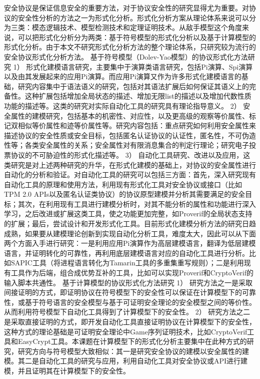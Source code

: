 安全协议是保证信息安全的重要方法，对于协议安全性的研究显得尤为重要。对协议的安全性分析的方法之一为形式化分析。形式化分析方案从理论体系来说可以分为三类：模态逻辑技术、模型检测技术和定理证明技术。从敌手模型这个角度来说，可以把形式化分析分为两类：基于符号模型的形式化分析以及基于计算模型的形式化分析。由于本文不研究形式化分析方法的整个理论体系，只研究较为流行的安全协议形式化分析方法。
基于符号模型（Dolev-Yao模型）的协议形式化方法研究
1）	形式化建模语言研究，主要集中于演算类语言研究，包括Pi演算、Spi演算以及由其发展起来的应用Pi演算。而应用Pi演算又作为许多形式化建模语言的基础，研究内容集中于语法语义的研究，包括对其语法扩展后如何保证其语义上的完备性。这种扩展包括增加全局状态的描述、增加无限list的描述以及增加代数性质功能的描述等。这类的研究对实际自动化工具的研究具有理论指导意义。
2）	安全属性的建模研究，包括基本的机密性、对应性，以及更高级的观察等价属性、标记双相似等价属性和迹等价属性等。研究内容包括：重点研究如何利用安全属性来描述协议的安全性质或安全目标，包括匿名认证协议的认证性，匿名性，不可伪造性等；各类安全属性的关系；安全属性对有限消息集合的判定行理论；研究电子投票协议的不可胁迫性的形式化描述等。
3）	自动化工具研究、改进以及应用，这类研究是对上述两种研究的升华，在形式化建模的基础上，对协议的安全属性进行自动化的分析和验证。对自动化工具的研究可以包括三方面：首先，深入研究现有自动化工具的原理和使用方法，利用现有形式化工具对安全协议或接口（比如TPM 2.0 APIs以及匿名认证类协议）的协议原型建模并分析其需要满足的安全目标；其次，在利用现有工具进行建模分析时，对其不能分析的属性和功能进行深入学习，之后改进或扩展这类工具，使之功能更加完整，如Proverif的全局状态支持的扩展；最后，尝试设计和开发形式化工具。目前形式化建模分析方法的研究日趋成熟，如果要从建模理论创新到实现自动化分析工具，难度太大，因此可以从下面两个方面入手进行研究：一是利用应用Pi演算作为高层建模语言，翻译为低层建模语言，并证明转化的可靠性，再利用底层建模语言对应的自动化工具进行分析。比如SAPIC工具（将进程语言转化为Tamarin工具的多重集重写规则）；二是利用现有工具作为后端，组合成优势互补的工具，比如可以实现Proverif和CryptoVerif的输入脚本共通性。
基于计算模型的协议形式化方法研究
1）	研究方法之一是采取间接证明的方式，即证明协议在符号模型下的安全性可以保证在计算模型下的可靠性，或基于符号语言的安全模型与基于可证明安全理论的安全模型之间的等价性。从而利用符号模型下自动化工具得到了计算模型下的安全性。
2）	研究方法之二是采取直接证明的方式，即开发自动化工具直接证明协议在计算模型下的安全性，这种方式的理论基础是可证明安全理论中Game序列证明技术，比如CryptoVerif工具和EasyCrypt工具。本课题在计算模型下的形式化分析主要集中在此种方式的研究，研究方向与符号模型大致相似：其一是研究安全协议的建模以安全属性的建模。其二是自动化工具的研究与应用，利用自动化工具对安全协议或API进行建模，并且证明其在计算模型下的安全性。
